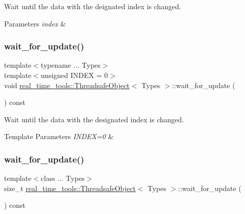 Wait until the data with the deignated index is changed. 


\begin{DoxyParams}{Parameters}
{\em index} & \\
\hline
\end{DoxyParams}
\mbox{\label{classreal__time__tools_1_1ThreadsafeObject_a2b1cc6a7d2691e8266130701975fd1f1}} 
\subsubsection{\texorpdfstring{wait\+\_\+for\+\_\+update()}{wait\_for\_update()}\hspace{0.1cm}{\footnotesize\ttfamily [2/3]}}
{\footnotesize\ttfamily template$<$typename ... Types$>$ \\
template$<$unsigned I\+N\+D\+EX = 0$>$ \\
void \hyperlink{classreal__time__tools_1_1ThreadsafeObject}{real\+\_\+time\+\_\+tools\+::\+Threadsafe\+Object}$<$ Types $>$\+::wait\+\_\+for\+\_\+update (\begin{DoxyParamCaption}{ }\end{DoxyParamCaption}) const\hspace{0.3cm}{\ttfamily [inline]}}



Wait until the data with the designated index is changed. 


\begin{DoxyTemplParams}{Template Parameters}
{\em I\+N\+D\+E\+X=0} & \\
\hline
\end{DoxyTemplParams}
\mbox{\label{classreal__time__tools_1_1ThreadsafeObject_a16807abf31871861f2fc3e228ecda18f}} 
\subsubsection{\texorpdfstring{wait\+\_\+for\+\_\+update()}{wait\_for\_update()}\hspace{0.1cm}{\footnotesize\ttfamily [3/3]}}
{\footnotesize\ttfamily template$<$class ... Types$>$ \\
size\+\_\+t \hyperlink{classreal__time__tools_1_1ThreadsafeObject}{real\+\_\+time\+\_\+tools\+::\+Threadsafe\+Object}$<$ Types $>$\+::wait\+\_\+for\+\_\+update (\begin{DoxyParamCaption}{ }\end{DoxyParamCaption}) const}




